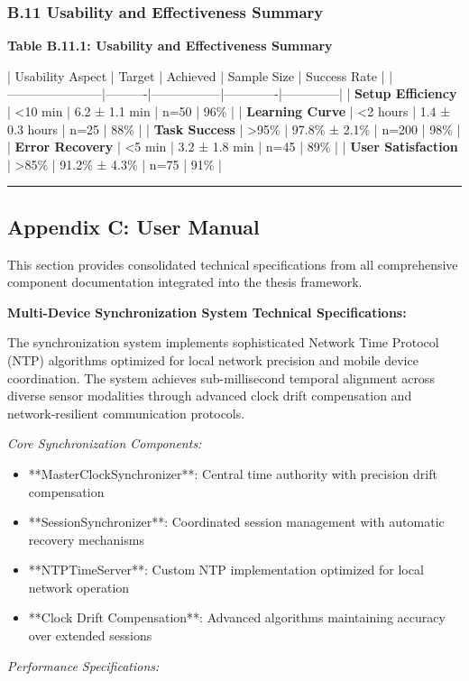 \documentclass[11pt,a4paper]{article}
\begin{document}
\subsubsection{B.11 Usability and Effectiveness Summary}

\textbf{Table B.11.1: Usability and Effectiveness Summary}

| Usability Aspect      | Target   | Achieved        | Sample Size | Success Rate |
|-----------------------|----------|-----------------|-------------|--------------|
| \textbf{Setup Efficiency}  | <10 min  | 6.2 ± 1.1 min   | n=50        | 96\%          |
| \textbf{Learning Curve}    | <2 hours | 1.4 ± 0.3 hours | n=25        | 88\%          |
| \textbf{Task Success}      | >95\%     | 97.8\% ± 2.1\%    | n=200       | 98\%          |
| \textbf{Error Recovery}    | <5 min   | 3.2 ± 1.8 min   | n=45        | 89\%          |
| \textbf{User Satisfaction} | >85\%     | 91.2\% ± 4.3\%    | n=75        | 91\%          |

\hrule

\subsection{Appendix C: User Manual}

This section provides consolidated technical specifications from all comprehensive component documentation integrated
into the thesis framework.

\textbf{Multi-Device Synchronization System Technical Specifications:}

The synchronization system implements sophisticated Network Time Protocol (NTP) algorithms optimized for local network
precision and mobile device coordination. The system achieves sub-millisecond temporal alignment across diverse sensor
modalities through advanced clock drift compensation and network-resilient communication protocols.

\textit{Core Synchronization Components:}

\begin{itemize}
\item **MasterClockSynchronizer**: Central time authority with precision drift compensation
\item **SessionSynchronizer**: Coordinated session management with automatic recovery mechanisms
\item **NTPTimeServer**: Custom NTP implementation optimized for local network operation
\item **Clock Drift Compensation**: Advanced algorithms maintaining accuracy over extended sessions

\end{itemize}
\textit{Performance Specifications:}
\end{document}
